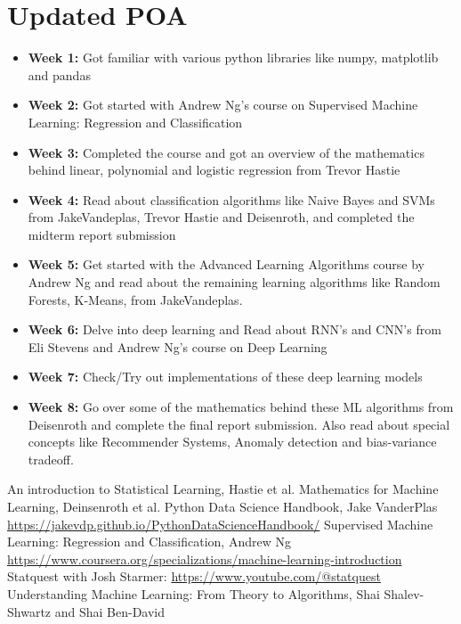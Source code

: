 \documentclass[12pt]{article}
\begin{document}
\begin{itemize}
\begin{center}
        \end{center}
\end{itemize}





\newpage
\section{Updated POA}
\begin{itemize}
    \item \textbf{Week 1: }Got familiar with various python libraries like numpy, matplotlib and pandas
    \item \textbf{Week 2: }Got started with Andrew Ng's course on Supervised Machine Learning: Regression and Classification
    \item \textbf{Week 3: }Completed the course and got an overview of the mathematics behind linear, polynomial and logistic regression from Trevor Hastie
    \item \textbf{Week 4: }Read about classification algorithms like Naive Bayes and SVMs from JakeVandeplas, Trevor Hastie and Deisenroth, and completed the midterm report submission
    \item \textbf{Week 5: }Get started with the Advanced Learning Algorithms course by Andrew Ng and read about the remaining learning algorithms like Random Forests, K-Means, from JakeVandeplas.
    \item \textbf{Week 6: }Delve into deep learning and Read about RNN’s and CNN’s from Eli Stevens and Andrew Ng’s course on Deep Learning
    \item \textbf{Week 7: }Check/Try out implementations of these deep learning models
    \item \textbf{Week 8: }Go over some of the mathematics behind these ML algorithms from Deisenroth and complete the final report submission. Also read about special concepts like Recommender Systems, Anomaly detection and bias-variance tradeoff.
\end{itemize}
\newpage
\begin{thebibliography}{9}

An introduction to Statistical Learning, Hastie et al.
Mathematics for Machine Learning, Deinsenroth et al.
Python Data Science Handbook, Jake VanderPlas \url{https://jakevdp.github.io/PythonDataScienceHandbook/}
 Supervised Machine Learning: Regression and Classification, Andrew Ng \url{https://www.coursera.org/specializations/machine-learning-introduction}
Statquest with Josh Starmer: \url{https://www.youtube.com/@statquest}
Understanding Machine Learning: From Theory to Algorithms, Shai Shalev-Shwartz and Shai Ben-David

\end{thebibliography}
\end{document}
